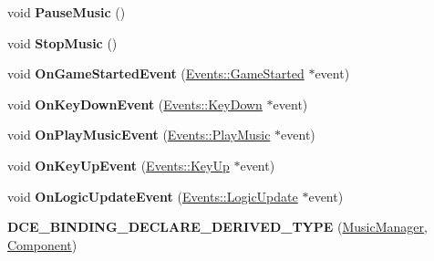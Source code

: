 \begin{DoxyCompactItemize}
\item 
\hypertarget{classDCEngine_1_1Components_1_1MusicManager_a04f6f347e6bbeacf795291fdd167da4d}{void {\bfseries Pause\-Music} ()}\label{classDCEngine_1_1Components_1_1MusicManager_a04f6f347e6bbeacf795291fdd167da4d}

\item 
\hypertarget{classDCEngine_1_1Components_1_1MusicManager_ad4cfa9db7169e92efe9bf1cb83c6a129}{void {\bfseries Stop\-Music} ()}\label{classDCEngine_1_1Components_1_1MusicManager_ad4cfa9db7169e92efe9bf1cb83c6a129}

\item 
\hypertarget{classDCEngine_1_1Components_1_1MusicManager_a276ba229f14657aad62146403d8460d9}{void {\bfseries On\-Game\-Started\-Event} (\hyperlink{classDCEngine_1_1Events_1_1GameStarted}{Events\-::\-Game\-Started} $\ast$event)}\label{classDCEngine_1_1Components_1_1MusicManager_a276ba229f14657aad62146403d8460d9}

\item 
\hypertarget{classDCEngine_1_1Components_1_1MusicManager_aee91a9fb45cbc72bc034e6a9e06ad9df}{void {\bfseries On\-Key\-Down\-Event} (\hyperlink{classDCEngine_1_1Events_1_1KeyDown}{Events\-::\-Key\-Down} $\ast$event)}\label{classDCEngine_1_1Components_1_1MusicManager_aee91a9fb45cbc72bc034e6a9e06ad9df}

\item 
\hypertarget{classDCEngine_1_1Components_1_1MusicManager_a87bee84fa2ab4415e92b7512b9670c44}{void {\bfseries On\-Play\-Music\-Event} (\hyperlink{classDCEngine_1_1Events_1_1PlayMusic}{Events\-::\-Play\-Music} $\ast$event)}\label{classDCEngine_1_1Components_1_1MusicManager_a87bee84fa2ab4415e92b7512b9670c44}

\item 
\hypertarget{classDCEngine_1_1Components_1_1MusicManager_a4aea160995e07ed61cc3001acea336c0}{void {\bfseries On\-Key\-Up\-Event} (\hyperlink{classDCEngine_1_1Events_1_1KeyUp}{Events\-::\-Key\-Up} $\ast$event)}\label{classDCEngine_1_1Components_1_1MusicManager_a4aea160995e07ed61cc3001acea336c0}

\item 
\hypertarget{classDCEngine_1_1Components_1_1MusicManager_a05eb3d2ad8da7421ff4a30e8689b1158}{void {\bfseries On\-Logic\-Update\-Event} (\hyperlink{classDCEngine_1_1Events_1_1LogicUpdate}{Events\-::\-Logic\-Update} $\ast$event)}\label{classDCEngine_1_1Components_1_1MusicManager_a05eb3d2ad8da7421ff4a30e8689b1158}

\item 
\hypertarget{classDCEngine_1_1Components_1_1MusicManager_a8cf5261fa2fafd50dada014ca07dd466}{{\bfseries D\-C\-E\-\_\-\-B\-I\-N\-D\-I\-N\-G\-\_\-\-D\-E\-C\-L\-A\-R\-E\-\_\-\-D\-E\-R\-I\-V\-E\-D\-\_\-\-T\-Y\-P\-E} (\hyperlink{classDCEngine_1_1Components_1_1MusicManager}{Music\-Manager}, \hyperlink{classDCEngine_1_1Component}{Component})}\label{classDCEngine_1_1Components_1_1MusicManager_a8cf5261fa2fafd50dada014ca07dd466}

\end{DoxyCompactItemize}
